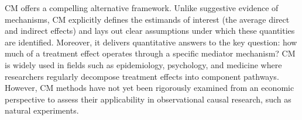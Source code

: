 
CM offers a compelling alternative framework.
Unlike suggestive evidence of mechanisms, CM explicitly defines the estimands of interest (the average direct and indirect effects) and lays out clear assumptions under which these quantities are identified.
Moreover, it delivers quantitative answers to the key question: how much of a treatment effect operates through a specific mediator mechanism?
CM is widely used in fields such as epidemiology, psychology, and medicine where researchers regularly decompose treatment effects into component pathways.
However, CM methods have not yet been rigorously examined from an economic perspective to assess their applicability in observational causal research, such as natural experiments.
